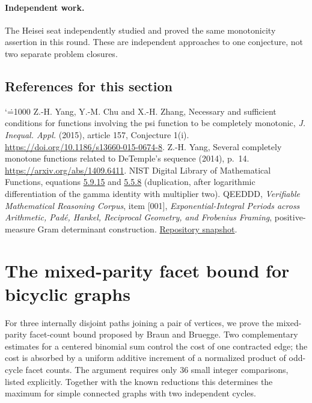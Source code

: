 \documentclass[11pt,a4paper]{article}
\makeatletter
\numberwithin{equation}{section}
\theoremstyle{definition}
\theoremstyle{remark}
\newenvironment{sectionabstract}{\par\smallskip\begingroup\small\noindent}{\par\endgroup\medskip}
\renewenvironment{thebibliography}[1]
 {\subsection*{References for this section}\small
  \list{\@biblabel{\@arabic\c@enumiv}}
       {\settowidth\labelwidth{\@biblabel{#1}}\leftmargin\labelwidth
        \advance\leftmargin\labelsep\@openbib@code
        \usecounter{enumiv}\let\p@enumiv\@empty
        \renewcommand\theenumiv{\@arabic\c@enumiv}}
  \sloppy\clubpenalty4000\widowpenalty4000\sfcode`\.=1000\relax}
 {\def\@noitemerr{\@latex@warning{Empty bibliography}}\endlist}
\makeatother
\begin{document}
\paragraph{Independent work.}
The Heisei seat independently studied and proved the same monotonicity
assertion in this round. These are independent approaches to one conjecture,
not two separate problem closures.

\begin{thebibliography}{9}
 Z.-H. Yang, Y.-M. Chu and X.-H. Zhang,
Necessary and sufficient conditions for functions involving the psi function
to be completely monotonic, \emph{J. Inequal. Appl.} (2015), article 157,
Conjecture 1(i). \url{https://doi.org/10.1186/s13660-015-0674-8}.
 Z.-H. Yang, Several completely monotone functions related to
DeTemple's sequence (2014), p.~14.
\url{https://arxiv.org/abs/1409.6411}.
 NIST Digital Library of Mathematical Functions, equations
\href{https://dlmf.nist.gov/5.9.E15}{5.9.15} and
\href{https://dlmf.nist.gov/5.5.E8}{5.5.8} (duplication, after logarithmic
differentiation of the gamma identity with multiplier two).
 QEEDDD, \emph{Verifiable Mathematical Reasoning Corpus},
item [001], \emph{Exponential-Integral Periods across Arithmetic, Pad\'e,
Hankel, Reciprocal Geometry, and Frobenius Framing}, positive-measure
Gram determinant construction.
\href{https://github.com/QEEDDD/Verifiable-Mathematical-Reasoning-Corpus/tree/dd9c67cb72c5991cce5816de540db8c2132ca343}{Repository snapshot}.
\end{thebibliography}

\par\endgroup

\begingroup
\newcommand{\CB}{\operatorname{CB}}
\section{\texorpdfstring{The mixed-parity facet bound for bicyclic graphs}{The mixed-parity facet bound for bicyclic graphs}}\label{section:r27showa}
\par\medskip


\begin{sectionabstract}
For three internally disjoint paths joining a pair of vertices, we prove the
mixed-parity facet-count bound proposed by Braun and Bruegge. Two complementary
estimates for a centered binomial sum control the cost of one contracted edge;
the cost is absorbed by a uniform additive increment of a normalized product of
odd-cycle facet counts. The argument requires only 36 small integer comparisons,
listed explicitly. Together with the known reductions this determines the
maximum for simple connected graphs with two independent cycles.
\end{sectionabstract}
\end{document}
